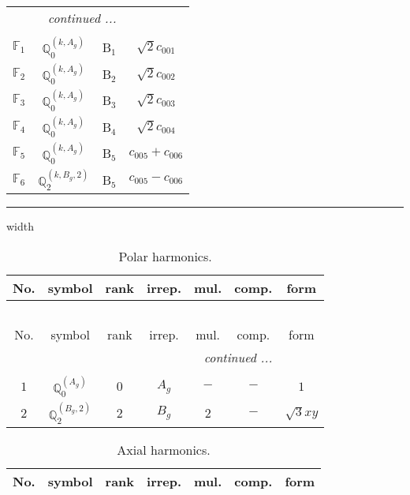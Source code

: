 \documentclass[fleqn,10pt,landscape]{article}
\begin{document}
\begin{itemize}
\begin{center}
\begin{longtable}{c|c|c|c}
 \hline \hline
\multicolumn{3}{r}{\footnotesize\it continued ...} \\ \endfoot

 \hline \hline
\multicolumn{3}{r}{} \\ \endlastfoot

$ \mathbb{F}_{1} $ & $\mathbb{Q}_{0}^{(k,A_{g})}$ & B$_{1}$ & $\sqrt{2} c_{001}$ \\ \hline
$ \mathbb{F}_{2} $ & $\mathbb{Q}_{0}^{(k,A_{g})}$ & B$_{2}$ & $\sqrt{2} c_{002}$ \\ \hline
$ \mathbb{F}_{3} $ & $\mathbb{Q}_{0}^{(k,A_{g})}$ & B$_{3}$ & $\sqrt{2} c_{003}$ \\ \hline
$ \mathbb{F}_{4} $ & $\mathbb{Q}_{0}^{(k,A_{g})}$ & B$_{4}$ & $\sqrt{2} c_{004}$ \\ \hline
$ \mathbb{F}_{5} $ & $\mathbb{Q}_{0}^{(k,A_{g})}$ & B$_{5}$ & $c_{005} + c_{006}$ \\
$ \mathbb{F}_{6} $ & $\mathbb{Q}_{2}^{(k,B_{g},2)}$ & B$_{5}$ & $c_{005} - c_{006}$ \\
\end{longtable}
\end{center}

 \hfil \hrule height 1mm width \textwidth \hfil

\begin{center}
\renewcommand{\arraystretch}{1.3}
\begin{longtable}{ccccccc}
\caption{Polar harmonics.}
 \\
 \hline \hline
No. & symbol & rank & irrep. & mul. & comp. & form \\ \hline \endfirsthead

\multicolumn{6}{l}{\tablename\ \thetable{}} \\
 \hline \hline
No. & symbol & rank & irrep. & mul. & comp. & form \\ \hline \endhead

 \hline \hline
\multicolumn{6}{r}{\footnotesize\it continued ...} \\ \endfoot

 \hline \hline
\multicolumn{6}{r}{} \\ \endlastfoot

$ 1 $ & $ \mathbb{Q}_{0}^{(A_{g})} $ & $ 0 $ & $ A_{g} $ & $ - $ & $ - $ & $ 1 $ \\ \hline
$ 2 $ & $ \mathbb{Q}_{2}^{(B_{g},2)} $ & $ 2 $ & $ B_{g} $ & $ 2 $ & $ - $ & $ \sqrt{3} x y $ \\
\end{longtable}
\end{center}
\begin{center}
\renewcommand{\arraystretch}{1.3}
\begin{longtable}{ccccccc}
\caption{Axial harmonics.}
 \\
 \hline \hline
No. & symbol & rank & irrep. & mul. & comp. & form \\ \hline \endfirsthead


\end{longtable}
\end{center}
\end{itemize}
\end{document}
